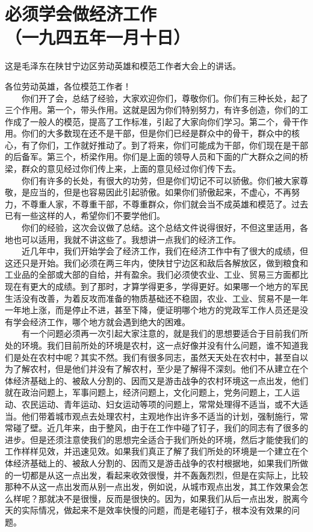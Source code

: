 \documentclass[cn,11pt,chinese]{elegantbook}
\def\myformat#1{\hfil\hfil #1}
\begin{document}
\newpage\section*{\myformat{必须学会做经济工作}\\\myformat{（一九四五年一月十日）}}
\begin{introduction}\item  这是毛泽东在陕甘宁边区劳动英雄和模范工作者大会上的讲话。\end{introduction}
各位劳动英雄，各位模范工作者！\\
　　你们开了会，总结了经验，大家欢迎你们，尊敬你们。你们有三种长处，起了三个作用。第一个，带头作用。这就是因为你们特别努力，有许多创造，你们的工作成了一般人的模范，提高了工作标准，引起了大家向你们学习。第二个，骨干作用。你们的大多数现在还不是干部，但是你们已经是群众中的骨干，群众中的核心，有了你们，工作就好推动了。到了将来，你们可能成为干部，你们现在是干部的后备军。第三个，桥梁作用。你们是上面的领导人员和下面的广大群众之间的桥梁，群众的意见经过你们传上来，上面的意见经过你们传下去。\\
　　你们有许多的长处，有很大的功劳，但是你们切记不可以骄傲。你们被大家尊敬，是应当的，但是也容易因此引起骄傲。如果你们骄傲起来，不虚心，不再努力，不尊重人家，不尊重干部，不尊重群众，你们就会当不成英雄和模范了。过去已有一些这样的人，希望你们不要学他们。\\
　　你们的经验，这次会议做了总结。这个总结文件说得很好，不但这里适用，各地也可以适用，我就不讲这些了。我想讲一点我们的经济工作。\\
　　近几年中，我们开始学会了经济工作，我们在经济工作中有了很大的成绩，但这还只是开始。我们必须在两三年内，使陕甘宁边区和敌后各解放区，做到粮食和工业品的全部或大部的自给，并有盈余。我们必须使农业、工业、贸易三方面都比现在有更大的成绩。到了那时，才算学得更多，学得更好。如果哪一个地方的军民生活没有改善，为着反攻而准备的物质基础还不稳固，农业、工业、贸易不是一年一年地上涨，而是停止不进，甚至下降，便证明哪个地方的党政军工作人员还是没有学会经济工作，哪个地方就会遇到绝大的困难。\\
　　有一个问题必须再一次引起大家注意的，就是我们的思想要适合于目前我们所处的环境。我们目前所处的环境是农村，这一点好像并没有什么问题，谁不知道我们是处在农村中呢？其实不然。我们有很多同志，虽然天天处在农村中，甚至自以为了解农村，但是他们并没有了解农村，至少是了解得不深刻。他们不从建立在个体经济基础上的、被敌人分割的、因而又是游击战争的农村环境这一点出发，他们就在政治问题上，军事问题上，经济问题上，文化问题上，党务问题上，工人运动、农民运动、青年运动、妇女运动等项的问题上，常常处理得不适当，或不大适当。他们带着城市观点去处理农村，主观地作出许多不适当的计划，强制施行，常常碰了壁。近几年来，由于整风，由于在工作中碰了钉子，我们的同志有了很多的进步。但是还须注意使我们的思想完全适合于我们所处的环境，然后才能使我们的工作样样见效，并迅速见效。如果我们真正了解了我们所处的环境是一个建立在个体经济基础上的、被敌人分割的、因而又是游击战争的农村根据地，如果我们所做的一切都是从这一点出发，看起来收效很慢，并不轰轰烈烈，但是在实际上，比较那种不从这一点出发而从别一点出发，例如说，从城市观点出发，其工作效果会怎么样呢？那就决不是很慢，反而是很快的。因为，如果我们从后一点出发，脱离今天的实际情况，做起来不是效率快慢的问题，而是老碰钉子，根本没有效果的问题。\\
\end{document}
